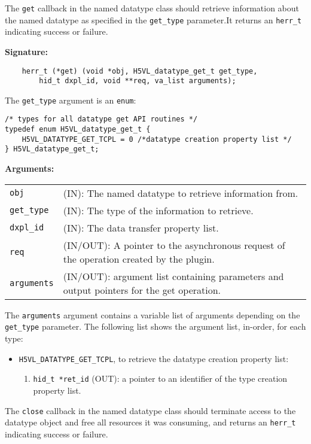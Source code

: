 The {\tt get} callback in the named datatype class should retrieve
information about the named datatype as specified in the {\tt get\_type}
parameter.It returns an {\tt herr\_t} indicating success or failure.

\textbf{Signature:}
\begin{lstlisting}
    herr_t (*get) (void *obj, H5VL_datatype_get_t get_type, 
        hid_t dxpl_id, void **req, va_list arguments);
\end{lstlisting}

The {\tt get\_type} argument is an {\tt enum}:
\begin{lstlisting}
/* types for all datatype get API routines */
typedef enum H5VL_datatype_get_t {
    H5VL_DATATYPE_GET_TCPL = 0 /*datatype creation property list */
} H5VL_datatype_get_t;
\end{lstlisting}

\textbf{Arguments:}\\
\begin{tabular}{l p{10cm}}
  {\tt obj} & (IN): The named datatype to retrieve information from.\\
  {\tt get\_type} & (IN): The type of the information to retrieve.\\
  {\tt dxpl\_id} & (IN): The data transfer property list.\\
  {\tt req} & (IN/OUT): A pointer to the asynchronous request of the
  operation created by the plugin.\\
  {\tt arguments} & (IN/OUT): argument list containing parameters and
  output pointers for the get operation. \\
\end{tabular}

The {\tt arguments} argument contains a variable list of arguments
depending on the {\tt get\_type} parameter. The following list shows
the argument list, in-order, for each type:

\begin{itemize}
\item {\tt H5VL\_DATATYPE\_GET\_TCPL}, to retrieve the datatype
  creation property list:
  \begin{enumerate}
  \item {\tt hid\_t *ret\_id} (OUT): a pointer to an identifier of the
    type creation property list.
  \end{enumerate}
\end{itemize}

The {\tt close} callback in the named datatype class should terminate
access to the datatype object and free all resources it was
consuming, and returns an {\tt herr\_t} indicating success or failure.

